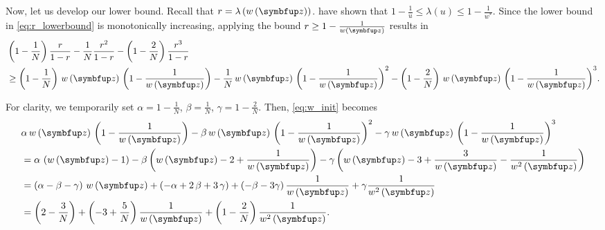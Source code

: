 \begin{proofEnd}
Now, let us develop our lower bound.
Recall that \(r = \lambda\left(w\left(\vz\right)\right)\).
\citet[Proof of Theorem 3]{tan_monte_2006} have shown that \(1 - \frac{1}{u} \leq \lambda\left(u\right) \leq 1 - \frac{1}{w^*}\).
Since the lower bound in \cref{eq:r_lowerbound} is monotonically increasing, applying the bound \(r \geq 1 - \frac{1}{w\left(\vz\right)}\) results in
\begin{align}
  &\left(1 - \frac{1}{N}\right) \frac{r}{1-r}
  -
  \frac{1}{N} \frac{r^2}{1-r}
  -
  \left(1 - \frac{2}{N}\right) \frac{r^3}{1-r}
  \nonumber \\
  &\geq
  \left(1 - \frac{1}{N}\right) \, w\left(\vz\right) \, \left(1 - \frac{1}{w\left(\vz\right)}\right)
  -
  \frac{1}{N} \, w\left(\vz\right) \, {\left(1 - \frac{1}{w\left(\vz\right)}\right)}^2
  -
  \left(1 - \frac{2}{N}\right) \, w\left(\vz\right) \, {\left(1 - \frac{1}{w\left(\vz\right)}\right)}^3.\label{eq:w_init}
\end{align}

For clarity, we temporarily set \(\alpha = 1 - \frac{1}{N}\), \(\beta = \frac{1}{N}\), \(\gamma = 1 - \frac{2}{N}\).
Then, \cref{eq:w_init} becomes
\begin{align*}
  &\alpha \, w\left(\vz\right) \, \left(1 - \frac{1}{w\left(\vz\right)}\right)
  -
  \beta \, w\left(\vz\right) \, {\left(1 - \frac{1}{w\left(\vz\right)}\right)}^2
  -
  \gamma \, w\left(\vz\right) \, {\left(1 - \frac{1}{w\left(\vz\right)}\right)}^3 \nonumber
  \\
  &=
  \alpha \, \left(w\left(\vz\right) - 1\right)
  -
  \beta \, {\left(w\left(\vz\right) - 2 + \frac{1}{w\left(\vz\right)} \right)}
  -
  \gamma \, {\left(w\left(\vz\right) - 3 + \frac{3}{w\left(\vz\right)} - \frac{1}{w^2\left(\vz\right)}  \right)}
  \\
  &=
  \left(\alpha - \beta - \gamma\right) \, w\left(\vz\right)
  +
  \left(-\alpha + 2\,\beta + 3\,\gamma\right)
  +
  \left(-\beta - 3 \gamma\right) \frac{1}{w\left(\vz\right)}
  +
  \gamma \frac{1}{w^2\left(\vz\right)}
  \\
  &=
  \left(2 - \frac{3}{N}\right)
  +
  \left(-3 + \frac{5}{N}\right) \frac{1}{w\left(\vz\right)}
  +
  \left(1 - \frac{2}{N}\right)  \frac{1}{w^2\left(\vz\right)}.
\end{align*}


\end{proofEnd}
